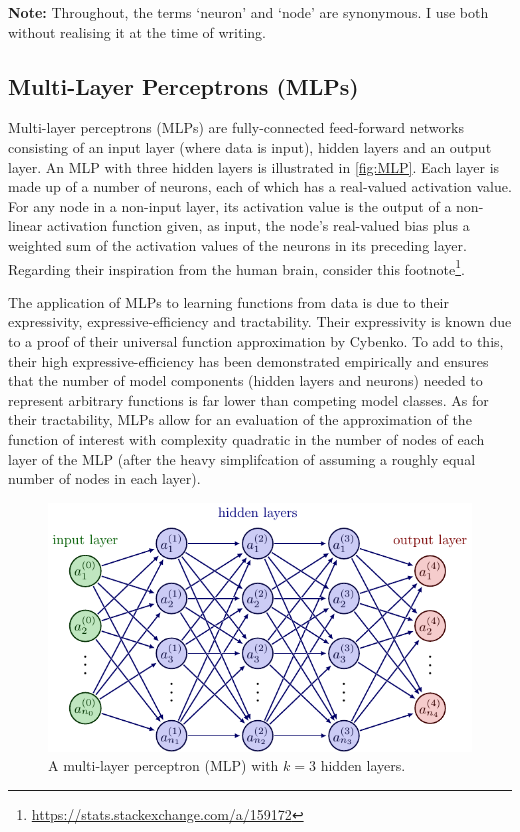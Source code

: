 \documentclass[11pt]{article}
\begin{document}
\noindent\textbf{Note:} Throughout, the terms `neuron' and `node' are synonymous. I use both without realising it at the time of writing.

\subsection{Multi-Layer Perceptrons (MLPs)}

Multi-layer perceptrons (MLPs) are fully-connected feed-forward networks consisting of an input layer (where data is input), hidden layers and an output layer. An MLP with three hidden layers is illustrated in \autoref{fig:MLP}. Each layer is made up of a number of neurons, each of which has a real-valued activation value.  For any node in a non-input layer, its activation value is the output of a non-linear activation function given, as input, the node's real-valued bias plus a weighted sum of the activation values of the neurons in its preceding layer. Regarding their inspiration from the human brain, consider this footnote\footnote{\url{https://stats.stackexchange.com/a/159172}}.

The application of MLPs to learning functions from data is due to their expressivity, expressive-efficiency and tractability. Their expressivity is known due to a proof of their universal function approximation by Cybenko. To add to this, their high expressive-efficiency has been demonstrated empirically and ensures that the number of model components (hidden layers and neurons) needed to represent arbitrary functions is far lower than competing model classes. As for their tractability, MLPs allow for an evaluation of the approximation of the function of interest with complexity quadratic in the number of nodes of each layer of the MLP (after the heavy simplifcation of assuming a roughly equal number of nodes in each layer).

\begin{figure}[ht]
    \centering
    \includegraphics[width=1\linewidth]{./figures/neural_nets/MLP_1.pdf}
    \caption{\centering A multi-layer perceptron (MLP) with $k=3$ hidden layers.}
    \label{fig:MLP}
\end{figure}
\end{document}
